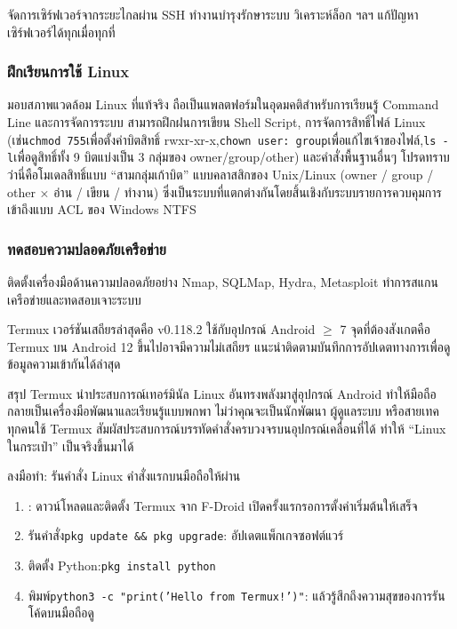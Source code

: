 จัดการเซิร์ฟเวอร์จากระยะไกลผ่าน SSH ทำงานบำรุงรักษาระบบ วิเคราะห์ล็อก ฯลฯ แก้ปัญหาเซิร์ฟเวอร์ได้ทุกเมื่อทุกที่

\subsubsection*{ฝึกเรียนการใช้ Linux}

มอบสภาพแวดล้อม Linux ที่แท้จริง ถือเป็นแพลตฟอร์มในอุดมคติสำหรับการเรียนรู้ Command Line และการจัดการระบบ สามารถฝึกฝนการเขียน Shell Script, การจัดการสิทธิ์ไฟล์ Linux (เช่น\texttt{chmod 755}เพื่อตั้งค่าบิตสิทธิ์ rwxr-xr-x,\texttt{chown user: group}เพื่อแก้ไขเจ้าของไฟล์,\texttt{ls -\allowbreak l}เพื่อดูสิทธิ์ทั้ง 9 บิตแบ่งเป็น 3 กลุ่มของ owner/group/other) และคำสั่งพื้นฐานอื่นๆ โปรดทราบว่านี่คือโมเดลสิทธิ์แบบ “สามกลุ่มเก้าบิต” แบบคลาสสิกของ Unix/Linux (owner / group / other × อ่าน / เขียน / ทำงาน) ซึ่งเป็นระบบที่แตกต่างกันโดยสิ้นเชิงกับระบบรายการควบคุมการเข้าถึงแบบ ACL ของ Windows NTFS

\subsubsection*{ทดสอบความปลอดภัยเครือข่าย}

ติดตั้งเครื่องมือด้านความปลอดภัยอย่าง Nmap, SQLMap, Hydra, Metasploit ทำการสแกนเครือข่ายและทดสอบเจาะระบบ


Termux เวอร์ชันเสถียรล่าสุดคือ v0.118.2 ใช้กับอุปกรณ์ Android $\geq$ 7 จุดที่ต้องสังเกตคือ Termux บน Android 12 ขึ้นไปอาจมีความไม่เสถียร แนะนำติดตามบันทึกการอัปเดตทางการเพื่อดูข้อมูลความเข้ากันได้ล่าสุด

\begin{tcbinfo}{สรุป}
Termux นำประสบการณ์เทอร์มินัล Linux อันทรงพลังมาสู่อุปกรณ์ Android ทำให้มือถือกลายเป็นเครื่องมือพัฒนาและเรียนรู้แบบพกพา ไม่ว่าคุณจะเป็นนักพัฒนา ผู้ดูแลระบบ หรือสายเทค ทุกคนใช้ Termux สัมผัสประสบการณ์บรรทัดคำสั่งครบวงจรบนอุปกรณ์เคลื่อนที่ได้ ทำให้ “Linux ในกระเป๋า” เป็นจริงขึ้นมาได้

\end{tcbinfo}

\begin{tcbpractice}{ลงมือทำ: รันคำสั่ง Linux คำสั่งแรกบนมือถือให้ผ่าน}
\begin{enumerate}
  \item : ดาวน์โหลดและติดตั้ง Termux จาก F-Droid เปิดครั้งแรกรอการตั้งค่าเริ่มต้นให้เสร็จ
  \item รันคำสั่ง\texttt{pkg update \&\& pkg upgrade}: อัปเดตแพ็กเกจซอฟต์แวร์
  \item ติดตั้ง Python:\texttt{pkg install python}
  \item พิมพ์\texttt{python3 -\allowbreak c "print('Hello from Termux!')"}: แล้วรู้สึกถึงความสุขของการรันโค้ดบนมือถือดู
\end{enumerate}

\end{tcbpractice}
